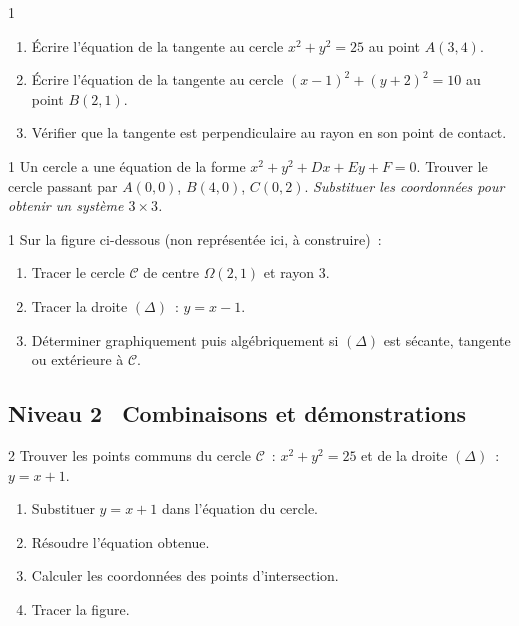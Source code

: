 \begin{exo}{1}
\begin{enumerate}
  \item \'Ecrire l'\'equation de la tangente au cercle $x^2+y^2=25$
        au point $A(3,4)$.
  \item \'Ecrire l'\'equation de la tangente au cercle $(x-1)^2+(y+2)^2=10$
        au point $B(2,1)$.
  \item V\'erifier que la tangente est perpendiculaire au rayon en son point de contact.
\end{enumerate}
\end{exo}

\begin{exo}{1}
Un cercle a une \'equation de la forme $x^2+y^2+Dx+Ey+F=0$.
Trouver le cercle passant par $A(0,0)$, $B(4,0)$, $C(0,2)$.
\emph{Substituer les coordonn\'ees pour obtenir un syst\`eme $3\times3$.}
\end{exo}

\begin{exo}{1}
Sur la figure ci-dessous (non repr\'esent\'ee ici, \`a construire)~:
\begin{enumerate}
  \item Tracer le cercle $\mathcal{C}$ de centre $\Omega(2,1)$ et rayon $3$.
  \item Tracer la droite $(\Delta)$~: $y=x-1$.
  \item D\'eterminer graphiquement puis alg\'ebriquement si $(\Delta)$
        est s\'ecante, tangente ou ext\'erieure \`a $\mathcal{C}$.
\end{enumerate}
\end{exo}

\subsection*{\quad Niveau 2 \textemdash\ Combinaisons et d\'emonstrations}

\begin{exo}{2}
Trouver les points communs du cercle $\mathcal{C}$~: $x^2+y^2=25$
et de la droite $(\Delta)$~: $y=x+1$.
\begin{enumerate}
  \item Substituer $y=x+1$ dans l'\'equation du cercle.
  \item R\'esoudre l'\'equation obtenue.
  \item Calculer les coordonn\'ees des points d'intersection.
  \item Tracer la figure.
\end{enumerate}
\end{exo}

